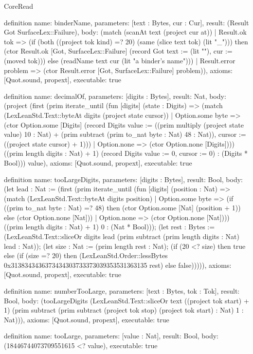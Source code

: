 \begin{lexlean}{CoreRead}
\begin{semanticmodule}
definition{
  name: binderName,
  parameters: [text : Bytes, cur : Cur],
  result: (Result Got SurfaceLex::Failure),
  body: (match (scanAt text (project cur at))
    | Result.ok tok => (if (both ((project tok kind) =? 20) (same (slice text tok) (lit "_"))) then (ctor Result.ok [Got, SurfaceLex::Failure] (record Got {text := (lit ""), cur := (moved tok)})) else (readName text cur (lit "a binder's name")))
    | Result.error problem => (ctor Result.error [Got, SurfaceLex::Failure] problem)),
  axioms: [Quot.sound, propext],
  executable: true
}

definition{
  name: decimalOf,
  parameters: [digits : Bytes],
  result: Nat,
  body: (project (first (prim iterate_until (fun [digits] (state : Digits) => (match (LexLeanStd.Text::byteAt digits (project state cursor))
    | Option.some byte => (ctor Option.some [Digits] (record Digits {value := ((prim multiply (project state value) 10 : Nat) + (prim subtract (prim to_nat byte : Nat) 48 : Nat)), cursor := ((project state cursor) + 1)}))
    | Option.none => (ctor Option.none [Digits]))) ((prim length digits : Nat) + 1) (record Digits {value := 0, cursor := 0}) : (Digits * Bool))) value),
  axioms: [Quot.sound, propext],
  executable: true
}

definition{
  name: tooLargeDigits,
  parameters: [digits : Bytes],
  result: Bool,
  body: (let lead : Nat := (first (prim iterate_until (fun [digits] (position : Nat) => (match (LexLeanStd.Text::byteAt digits position)
    | Option.some byte => (if ((prim to_nat byte : Nat) =? 48) then (ctor Option.some [Nat] (position + 1)) else (ctor Option.none [Nat]))
    | Option.none => (ctor Option.none [Nat]))) ((prim length digits : Nat) + 1) 0 : (Nat * Bool))); (let rest : Bytes := (LexLeanStd.Text::sliceOr digits lead (prim subtract (prim length digits : Nat) lead : Nat)); (let size : Nat := (prim length rest : Nat); (if (20 <? size) then true else (if (size =? 20) then (LexLeanStd.Order::lessBytes 0x3138343436373434303733373039353531363135 rest) else false))))),
  axioms: [Quot.sound, propext],
  executable: true
}

definition{
  name: numberTooLarge,
  parameters: [text : Bytes, tok : Tok],
  result: Bool,
  body: (tooLargeDigits (LexLeanStd.Text::sliceOr text ((project tok start) + 1) (prim subtract (prim subtract (project tok stop) (project tok start) : Nat) 1 : Nat))),
  axioms: [Quot.sound, propext],
  executable: true
}

definition{
  name: tooLarge,
  parameters: [value : Nat],
  result: Bool,
  body: (18446744073709551615 <? value),
  executable: true
}


\end{semanticmodule}
\end{lexlean}
